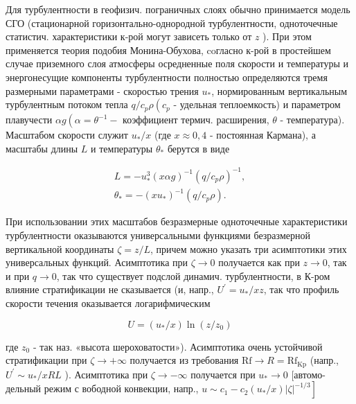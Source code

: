 \documentclass[10pt]{article}
\begin{document}
Для турбулентности в геофизич. пограничных слоях обычно принимается модель СГО (стационарной горизонтально-однородной турбулентности, одноточечные статистич. характеристики к-рой могут зависеть только от $z$ ). При этом применяется теория подобия Монина-Обухова, coгласно к-рой в простейшем случае приземного слоя атмосферы осредненные поля скорости и температуры и энергонесущие компоненты турбулентности полностью определяются тремя размерными параметрами - скоростью трения $u_{*}$, нормированным вертикальным турбулентным потоком тепла $q / c_{p} \rho\left(c_{p}\right.$ - удельная теплоемкость) и параметром плавучести $\alpha g\left(\alpha=\theta^{-1}-\right.$ коэффициент термич. расширения, $\theta$ - температура). Масштабом скорости служит $u_{*} / x$ (где $x \approx 0,4$ - постоянная Кармана), а масштабы длины $L$ и температуры $\theta_{*}$ берутся в виде



\[

\begin{gathered}

L=-u_{*}^{3}(x \alpha g)^{-1}\left(q / c_{p} \rho\right)^{-1}, \\

\theta_{*}=-\left(x u_{*}\right)^{-1}\left(q / c_{p} \rho\right) .

\end{gathered}

\]



При использовании этих масштабов безразмерные одноточечные характеристики турбулентности оказываются универсальными функциями безразмерной вертикальной координаты $\zeta=z / L$, причем можно указать три асимптотики этих универсальных функций. Асимптотика при $\zeta \rightarrow 0$ получается как при $z \rightarrow 0$, так и при $q \rightarrow 0$, так что существует подслой динамич. турбулентности, в К-ром влияние стратификации не сказывается (и, напр., $U^{\prime}=u_{*} / x z$, так что профиль скорости течения оказывается логарифмическим



\[

U=\left(u_{*} / x\right) \ln \left(z / z_{0}\right)

\]



где $z_{0}$ - так наз. «высота шероховатости»). Асимптотика очень устойчивой стратификации при $\zeta \rightarrow+\infty$ получается из требования $\mathrm{Rf} \rightarrow R=\mathrm{Rf}_{\mathrm{Kp}}$ (напр., $U^{\prime} \sim u_{*} / x R L$ ). Асимптотика при $\zeta \rightarrow-\infty$ получается при $u_{*} \rightarrow 0$ [автомо- дельный режим с вободной конвекции, напр., $\left.u \sim c_{1}-c_{2}\left(u_{*} / x\right)|\zeta|^{-1 / 3}\right]$
\end{document}
